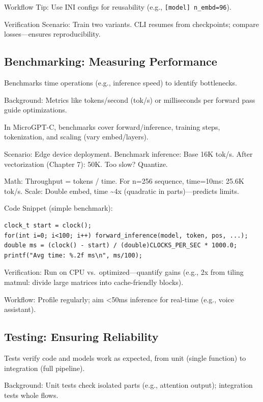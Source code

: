 \documentclass[
]{article}
\begin{document}
Workflow Tip: Use INI configs for reusability (e.g.,
\texttt{{[}model{]}\ n\_embd=96}).

Verification Scenario: Train two variants. CLI resumes from checkpoints;
compare losses---ensures reproducibility.

\subsection{Benchmarking: Measuring
Performance}\label{benchmarking-measuring-performance}

Benchmarks time operations (e.g., inference speed) to identify
bottlenecks.

Background: Metrics like tokens/second (tok/s) or milliseconds per
forward pass guide optimizations.

In MicroGPT-C, benchmarks cover forward/inference, training steps,
tokenization, and scaling (vary embed/layers).

Scenario: Edge device deployment. Benchmark inference: Base 16K tok/s.
After vectorization (Chapter 7): 50K. Too slow? Quantize.

Math: Throughput = tokens / time. For n=256 sequence, time=10ms: 25.6K
tok/s. Scale: Double embed, time \textasciitilde4x (quadratic in
parts)---predicts limits.

Code Snippet (simple benchmark):

\begin{verbatim}
clock_t start = clock();
for(int i=0; i<100; i++) forward_inference(model, token, pos, ...);
double ms = (clock() - start) / (double)CLOCKS_PER_SEC * 1000.0;
printf("Avg time: %.2f ms\n", ms/100);
\end{verbatim}

Verification: Run on CPU vs.~optimized---quantify gains (e.g., 2x from
tiling matmul: divide large matrices into cache-friendly blocks).

Workflow: Profile regularly; aim \textless50ms inference for real-time
(e.g., voice assistant).

\subsection{Testing: Ensuring
Reliability}\label{testing-ensuring-reliability}

Tests verify code and models work as expected, from unit (single
function) to integration (full pipeline).

Background: Unit tests check isolated parts (e.g., attention output);
integration tests whole flows.
\end{document}
